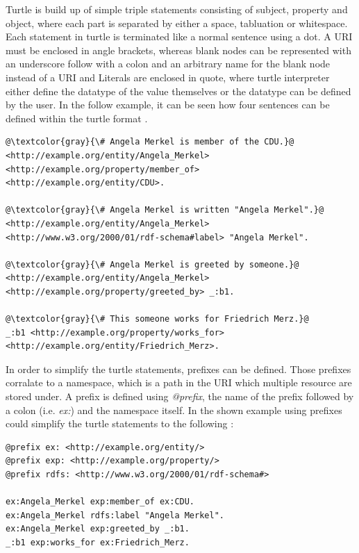 \documentclass[a4paper,oneside,bibliography=totoc]{scrbook}
\begin{document}
Turtle is build up of simple triple statements consisting of subject, property and object, where each part is separated by either a space, tabluation or whitespace. Each statement in turtle is terminated like a normal sentence using a dot. A \ac{URI} must be enclosed in angle brackets, whereas blank nodes can be represented with an underscore follow with a colon and an arbitrary name for the blank node instead of a \ac{URI} and Literals are enclosed in quote, where turtle interpreter either define the datatype of the value themselves or the datatype can be defined by the user. In the follow example, it can be seen how four sentences can be defined within the turtle format \cite{Tomaszuk2020}.


\begin{lstlisting}[language=Turtle, caption=Example of a Knowledge Graph in Turtle Format, label=lst:turtle_example, escapechar=@]
@\textcolor{gray}{\# Angela Merkel is member of the CDU.}@
<http://example.org/entity/Angela_Merkel> <http://example.org/property/member_of> <http://example.org/entity/CDU>.

@\textcolor{gray}{\# Angela Merkel is written "Angela Merkel".}@
<http://example.org/entity/Angela_Merkel> <http://www.w3.org/2000/01/rdf-schema#label> "Angela Merkel".

@\textcolor{gray}{\# Angela Merkel is greeted by someone.}@
<http://example.org/entity/Angela_Merkel> <http://example.org/property/greeted_by> _:b1.

@\textcolor{gray}{\# This someone works for Friedrich Merz.}@
_:b1 <http://example.org/property/works_for> <http://example.org/entity/Friedrich_Merz>.
\end{lstlisting}

In order to simplify the turtle statements, prefixes can be defined. Those prefixes corralate to a namespace, which is a path in the \ac{URI} which multiple resource are stored under. A prefix is defined using \textit{@prefix}, the name of the prefix followed by a colon (i.e. \textit{ex:}) and the namespace itself. In the shown example using prefixes could simplify the turtle statements to the following \cite{Tomaszuk2020}:

\begin{lstlisting}[language=Turtle, caption=Example of a Knowledge Graph in Turtle Format, label=lst:turtle_example]
@prefix ex: <http://example.org/entity/>
@prefix exp: <http://example.org/property/>
@prefix rdfs: <http://www.w3.org/2000/01/rdf-schema#>

ex:Angela_Merkel exp:member_of ex:CDU.
ex:Angela_Merkel rdfs:label "Angela Merkel".
ex:Angela_Merkel exp:greeted_by _:b1.
_:b1 exp:works_for ex:Friedrich_Merz.
\end{lstlisting}
\end{document}
